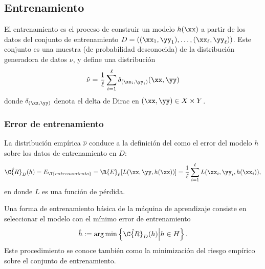 %
%
\subsection{Entrenamiento}
%
El entrenamiento es el proceso de construir un modelo $h(\xx)$ a
partir de los datos del conjunto de entrenamiento
$D=\left((\xx_1,\yy_1),\ldots,(\xx_\ell,\yy_\ell)\right)$.  Este
conjunto es una muestra (de probabilidad desconocida) de la
distribución generadora de datos $\nu$, y define una distribución
%
\begin{align}
  \hat{\nu}=\frac{1}{\ell}\sum_{i=1}^{\ell}\delta_{(\xx_i,\yy_i)}(\xx,\yy)
\end{align}
%
donde $\delta_{(\xx,\yy)}$ denota el delta de Dirac en
$(\xx,\yy)\in{}X\times{}Y$.
%
\subsubsection{Error de entrenamiento}
%
La distribución empírica $\hat{\nu}$ conduce a la definición del
 como el error del modelo $h$ sobre los
datos de entrenamiento en $D$:
%
\begin{align}
  \hat{\C{R}}_D(h)=E_\T{entrenamiento}=\R{E}_{\hat{\nu}}[L(\xx,\yy,h(\xx))]
  =\frac{1}{\ell}\sum_{i=1}^\ell L(\xx_i, \yy_i, h(\xx_i)),
\end{align}
%
en donde $L$ es una función de pérdida.
%

%
Una forma de entrenamiento básica de la máquina de aprendizaje consiste en 
seleccionar el modelo con el mínimo error de entrenamiento
%
\begin{align}
  \hat{h}:=\arg \min \left\{ \hat{\C{R}}_D(h)\middle|h \in H\right\}.
\end{align}
%
Este procedimiento se conoce también como la minimización del riesgo
empírico sobre el conjunto de entrenamiento.
